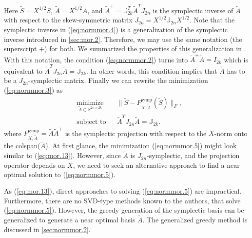 Here $\tilde S = X^{1/2} S$, $\tilde A = X^{1/2} A$, and $\tilde A^+ = \mathbb J_{2k}^T \tilde A^T J_{2n}$ is the symplectic inverse of $\tilde A$ with respect to the skew-symmetric matrix $J_{2n} = X^{1/2} \mathbb J_{2n} X^{1/2}$. Note that the symplectic inverse in (\ref{eq:normmor.4}) is a generalization of the symplectic inverse introduced in \cref{sec:mor.2}. Therefore, we may use the same notation (the superscript $+$) for both. We summarized the properties of this generalization in . With this notation, the condition (\ref{eq:normmor.2}) turns into $\tilde A ^+ \tilde A = I_{2k}$ which is equivalent to $\tilde A ^T J_{2n} \tilde A = \mathbb J_{2k}$. In other words, this condition implies that $\tilde A$ has to be a $J_{2n}$-symplectic matrix. Finally we can rewrite the minimization (\ref{eq:normmor.3}) as
\begin{equation} \label{eq:normmor.5}
\begin{aligned}
& \underset{\tilde A\in \mathbb{R}^{2n\times 2k}}{\text{minimize}}
& & \| \tilde S - P^\text{symp}_{X,\tilde A}(\tilde S) \|_F, \\
& \text{subject to}
& & \tilde A^T J_{2n} \tilde A = \mathbb J_{2k}.
\end{aligned}
\end{equation}
where $P^\text{symp}_{X,\tilde A} = \tilde A \tilde A^+$ is the symplectic projection with respect to the $X$-norm onto the colspan($\tilde A$). At first glance, the minimization (\ref{eq:normmor.5}) might look similar to (\ref{eq:mor.13}). However, since $\tilde A$ is $J_{2n}$-symplectic, and the projection operator depends on $X$, we need to seek an alternative approach to find a near optimal solution to (\ref{eq:normmor.5}). 

As (\ref{eq:mor.13}), direct approaches to solving (\ref{eq:normmor.5}) are impractical. Furthermore, there are no SVD-type methods known to the authors, that solve (\ref{eq:normmor.5}). However, the greedy generation of the symplectic basis can be generalized to generate a near optimal basis $\tilde A$. The generalized greedy method is discussed in \cref{sec:normmor.2}.

